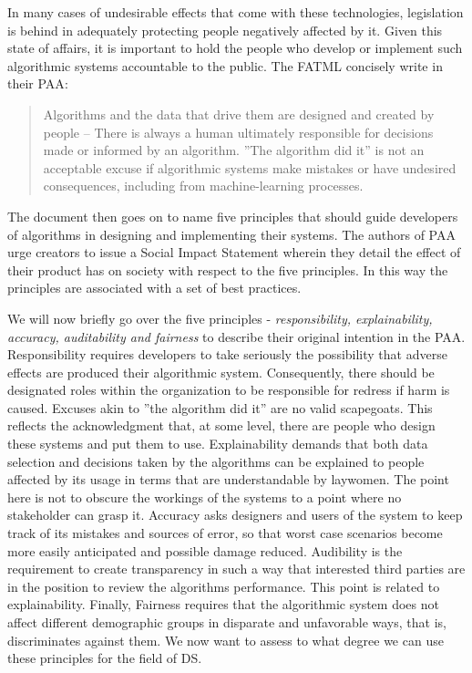 \documentclass{article}
\begin{document}
In many cases of undesirable effects that come with these technologies, legislation is behind in adequately protecting people negatively affected by it.
Given this state of affairs, it is important to hold the people who develop or implement such algorithmic systems accountable to the public. The FATML concisely write in their PAA\cite{principles}: 
\begin{quote}
Algorithms and the data that drive them are designed and created by people -- There is always a human ultimately responsible for decisions made or informed by an algorithm. ''The algorithm did it'' is not an acceptable excuse if algorithmic systems make mistakes or have undesired consequences, including from machine-learning processes.
\end{quote}

The document then goes on to name five principles that should guide developers of algorithms in designing and implementing their systems. The authors of PAA urge creators to issue a Social Impact Statement wherein they detail the effect of their product has on society with respect to the five principles. In this way the principles are associated with a set of best practices.

We will now briefly go over the five principles - \emph{responsibility, explainability, accuracy, auditability and fairness} to describe their original intention in the PAA.
Responsibility requires developers to take seriously the possibility that adverse effects are produced their algorithmic system. Consequently, there should be designated roles within the organization to be responsible for redress if harm is caused. Excuses akin to ''the algorithm did it'' are no valid scapegoats. This reflects the acknowledgment that, at some level, there are people who design these systems and put them to use.
Explainability demands that both data selection and decisions taken by the algorithms can be explained to people affected by its usage in terms that are understandable by laywomen. The point here is not to obscure the workings of the systems to a point where no stakeholder can grasp it.
Accuracy asks designers and users of the system to keep track of its mistakes and sources of error, so that worst case scenarios become more easily anticipated and possible damage reduced.
Audibility is the requirement to create transparency in such a way that interested third parties are in the position to review the algorithms performance. This point is related to explainability.
Finally, Fairness requires that the algorithmic system does not affect different demographic groups in disparate and unfavorable ways, that is, discriminates against them.
We now want to assess to what degree we can use these principles for the field of DS.
\end{document}
